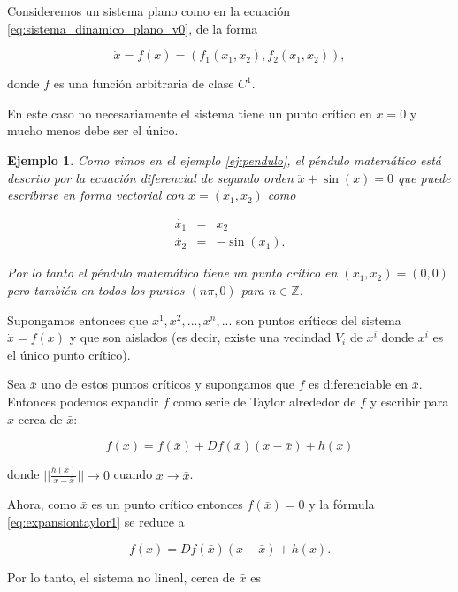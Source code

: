 \documentclass[11pt]{book}
\theoremstyle{definition}
\numberwithin{definition}{section}
\theoremstyle{theorem}
\numberwithin{theorem}{section}
\numberwithin{lemma}{section}
\numberwithin{corollary}{section}
\theoremstyle{plain}
\newtheorem{example}{Ejemplo}
\numberwithin{example}{section}
\newcommand{\Z}{{\ensuremath{\mathbb{Z}}}}
\begin{document}
Consideremos un sistema plano como en la ecuación \ref{eq:sistema_dinamico_plano_v0}, de la forma

\begin{equation}
	\dot{x} = f(x) = (f_1(x_1,x_2), f_2(x_1,x_2)),
\end{equation}

donde $f$ es una función arbitraria de clase $C^1$.

En este caso no necesariamente el sistema tiene un punto crítico en $x = 0$ y mucho menos debe ser el único.

\begin{example}Como vimos en el ejemplo \ref{ej:pendulo}, el péndulo matemático está descrito por la ecuación diferencial de segundo orden $\ddot{x} + \sin(x) = 0$ que puede escribirse en forma vectorial con $x = (x_1,x_2)$ como

$$
\begin{array}{lll}
	\dot{x_1} & = & x_2 \\
	\dot{x_2} & = & -\sin(x_1).
\end{array}
$$

Por lo tanto el péndulo matemático tiene un punto crítico en $(x_1,x_2) = (0,0)$ pero también en todos los puntos $(n\pi, 0)$ para $n \in \Z$.
\end{example}

Supongamos entonces que $x^1, x^2, ..., x^n, ...$ son puntos críticos del sistema $\dot{x} = f(x)$ y que son aislados (es decir, existe una vecindad  $V_i$ de $x^i$ donde $x^i$ es el único punto crítico).

Sea $\bar{x}$ uno de estos puntos críticos y supongamos que $f$ es diferenciable en $\bar{x}$. Entonces podemos expandir $f$ como serie de Taylor alrededor de $f$ y escribir para $x$ cerca de $\bar{x}$:

\begin{equation} \label{eq:expansiontaylor1}
	f(x) = f(\bar{x}) + Df(\bar{x})(x - \bar{x}) + h(x)
\end{equation}

donde $|| \frac{h(x)}{x - \bar{x}}|| \to 0$ cuando $x \to \bar{x}$.

Ahora, como $\bar{x}$ es un punto crítico entonces $f(\bar{x}) = 0$ y la fórmula \ref{eq:expansiontaylor1} se reduce a 

\begin{equation}
	f(x) = Df(\bar{x})(x - \bar{x}) + h(x).
\end{equation}

Por lo tanto, el sistema no lineal, cerca de $\bar{x}$ es
\end{document}
